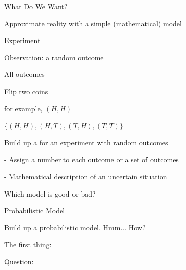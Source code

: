 \documentclass[fleqn,aspectratio=169]{beamer}
\begin{document}
\begin{frame}{What Do We Want?}


\hspace{-0.2in} Approximate reality with a simple (mathematical) model


{
\bci [$\circ$] 
\item<1-> Experiment

\item<2-> Observation: a random outcome

\item<3-> All outcomes
\eci 
}
{
\bci [$\circ$] 
\item<1-> Flip two coins

\item<2-> for example, $(H,H)$

\item<3-> $\{ (H,H), (H,T), (T,H), (T,T) \}$

\eci 
}
\separator

\bci

\item<4->  Build up a  for an experiment with random outcomes


\item<6->  

- Assign a number to each outcome or a set of outcomes

- Mathematical description of an uncertain situation

\item<7-> Which model is good or bad?

\eci
\end{frame}

\begin{frame}{Probabilistic Model}

 Build up a probabilistic model. Hmm... How?

The first thing: 

\bigskip

\bigskip

\alert{Question:} 

\end{frame}
\end{document}
